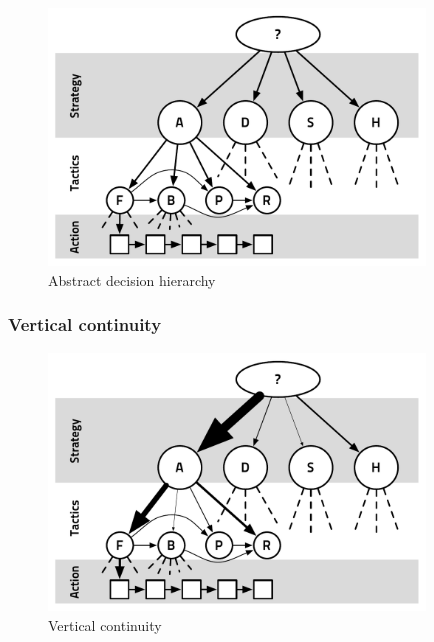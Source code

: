 \begin{figure}
\begin{center}
\includegraphics[width=10cm]{images/basic_abstract_decision_hierarchy2.pdf}
\end{center}
\caption{Abstract decision hierarchy}
\label{fig:abstractdecisionhierarchy}
\end{figure}

\subsubsection{Vertical continuity}
\begin{figure}
\begin{center}
\includegraphics[width=10cm]{images/vertical_cont_abstract_decision_hierarchy.pdf}
\end{center}
\caption{Vertical continuity}
\label{fig:verticalcont}
\end{figure}

